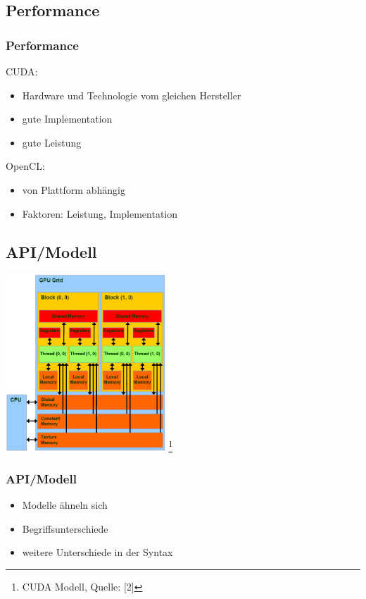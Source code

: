 \documentclass{beamer}
\begin{document}
\subsection{Performance}
\begin{frame}
\frametitle{Performance}
CUDA:
\begin{itemize}
\item Hardware und Technologie vom gleichen Hersteller
\item gute Implementation
\item gute Leistung
\newline
\end{itemize}
OpenCL:
\begin{itemize}
\item von Plattform abhängig
\item Faktoren: Leistung, Implementation
\end{itemize}
\end{frame}

\subsection{API/Modell}
\begin{frame}
\begin{center}
\includegraphics[width=6cm]{CUDAmodel.png}
\footnote{\tiny{CUDA Modell,  Quelle: [2]}}
\end{center}
\end{frame}

\begin{frame}
\frametitle{API/Modell}
\begin{itemize}
\item Modelle ähneln sich
\item Begriffsunterschiede
\item weitere Unterschiede in der Syntax
\end{itemize}
\end{frame}
\end{document}

